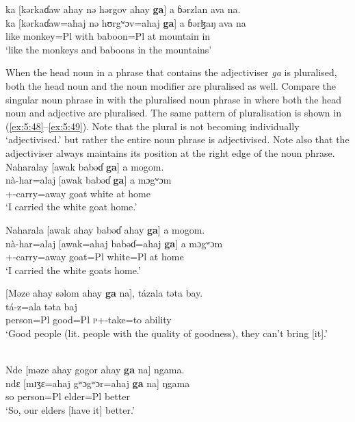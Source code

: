 \medskip
 ka [kərkaɗaw ahay nə hərgov ahay \textbf{ga}] a  ɓərzlan ava na.\\
\gll ka  [kərkaɗaw=ahaj    nə   hʊrgʷɔv=ahaj  \textbf{ga}]    a      ɓərɮaŋ     ava    na\\
      like  monkey=Pl        with    baboon=Pl  {\ADJ}  at    mountain    in    {\PSP}\\
\glt  ‘like the monkeys and baboons in the mountains’
\z

When the head noun in a phrase that contains the adjectiviser \textit{ga} is pluralised, both the head noun and the noun modifier are pluralised as well. Compare the singular noun phrase in  with the pluralised noun phrase in  where both the head noun and adjective are pluralised. %
The same pattern of pluralisation is shown in (\ref{ex:5:48}--\ref{ex:5:49}). Note that the plural is not becoming individually ‘adjectivised.’ but rather the entire noun phrase is adjectivised. Note also that the adjectiviser always maintains its position at the right edge of the noun phrase. 
\clearpage
\ea \label{ex:5:46}
Naharalay  [awak  babəɗ \textbf{ga}]  a  mogom.\\
\gll  nà-har=alaj    [awak    babəɗ    \textbf{ga}]  a  mɔgʷɔm\\
      {\oneS}+{\PFV}-carry=away    goat    white    {\ADJ}  at  home\\
\glt  ‘I carried the white goat home.’
\z

\ea \label{ex:5:47}
Naharala  [awak  ahay  babəɗ  ahay  \textbf{ga}]  a  mogom.\\
\gll  nà-har=alaj    [awak=ahaj  babəɗ=ahaj  \textbf{ga}]  a  mɔgʷɔm\\
      {\oneS}+{\PFV}-carry=away    goat=Pl  white=Pl  {\ADJ}  at  home\\
\glt  ‘I carried the white goats home.’
\z

\ea \label{ex:5:48}
 [Məze  ahay  səlom  ahay  \textbf{ga}   na], tázala  təta  bay.\\
\gll  [mɪʒɛ=ahaj   sʊlɔm=ahaj   \textbf{ga}   na]   tá-z=ala  təta     baj\\
      person=Pl     good=Pl   {\ADJ}   {\PSP}  \textsc{p}+{\IFV}-take=to  ability  {\NEG}\\
\glt  ‘Good people (lit. people with the quality of goodness), they can’t bring [it].' 
\z


\ea \label{ex:5:49}\\
Nde  [məze  ahay  gogor  ahay  \textbf{ga}   na]  ngama.\\
\gll  ndɛ  [mɪʒɛ=ahaj  gʷɔgʷɔr=ahaj   \textbf{ga}  na]   ŋgama\\
      so    person=Pl  elder=Pl   {\ADJ}   {\PSP}  better\\
\glt  ‘So, our elders [have it] better.'
\z

